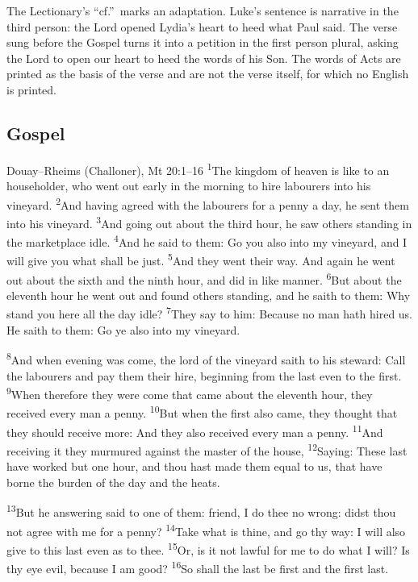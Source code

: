 \noindent The Lectionary's ``cf.''\ marks an adaptation. Luke's sentence is
narrative in the third person: the Lord opened Lydia's heart to heed what Paul
said. The verse sung before the Gospel turns it into a petition in the first
person plural, asking the Lord to open our heart to heed the words of his Son.
The words of Acts are printed as the basis of the verse and are not the verse
itself, for which no English is printed.

\subsection{Gospel}
\label{proper-gospel}


\begin{englishwitness}{Douay--Rheims (Challoner), Mt 20:1--16}
\textsuperscript{1}The kingdom of heaven is like to an householder, who went
out early in the morning to hire labourers into his vineyard.
\textsuperscript{2}And having agreed with the labourers for a penny a day, he
sent them into his vineyard. \textsuperscript{3}And going out about the third
hour, he saw others standing in the marketplace idle. \textsuperscript{4}And
he said to them: Go you also into my vineyard, and I will give you what shall
be just. \textsuperscript{5}And they went their way. And again he went out
about the sixth and the ninth hour, and did in like manner.
\textsuperscript{6}But about the eleventh hour he went out and found others
standing, and he saith to them: Why stand you here all the day idle?
\textsuperscript{7}They say to him: Because no man hath hired us. He saith to
them: Go ye also into my vineyard.

\textsuperscript{8}And when evening was come, the lord of the vineyard saith
to his steward: Call the labourers and pay them their hire, beginning from the
last even to the first. \textsuperscript{9}When therefore they were come that
came about the eleventh hour, they received every man a penny.
\textsuperscript{10}But when the first also came, they thought that they
should receive more: And they also received every man a penny.
\textsuperscript{11}And receiving it they murmured against the master of the
house, \textsuperscript{12}Saying: These last have worked but one hour, and
thou hast made them equal to us, that have borne the burden of the day and the
heats.

\textsuperscript{13}But he answering said to one of them: friend, I do thee no
wrong: didst thou not agree with me for a penny? \textsuperscript{14}Take what
is thine, and go thy way: I will also give to this last even as to thee.
\textsuperscript{15}Or, is it not lawful for me to do what I will? Is thy eye
evil, because I am good? \textsuperscript{16}So shall the last be first and
the first last. 
\end{englishwitness}

